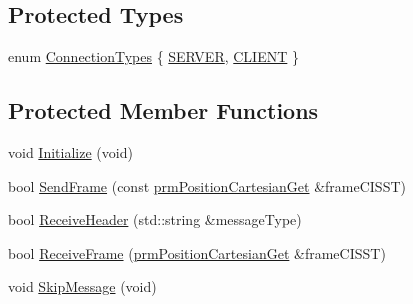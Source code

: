 \subsection*{Protected Types}
\begin{DoxyCompactItemize}
\item 
enum \hyperlink{classmts_open_i_g_t_link_aa7353a6a3f98f611defbaf89f13c8a27}{Connection\+Types} \{ \hyperlink{classmts_open_i_g_t_link_aa7353a6a3f98f611defbaf89f13c8a27a9cbc41def3c5107a96ae88dc2b81be4c}{S\+E\+R\+V\+E\+R}, 
\hyperlink{classmts_open_i_g_t_link_aa7353a6a3f98f611defbaf89f13c8a27a25025b3db414b3c15bc4c6664b876065}{C\+L\+I\+E\+N\+T}
 \}
\end{DoxyCompactItemize}
\subsection*{Protected Member Functions}
\begin{DoxyCompactItemize}
\item 
void \hyperlink{classmts_open_i_g_t_link_a77e185ccfb62504a0715138865d15b85}{Initialize} (void)
\item 
bool \hyperlink{classmts_open_i_g_t_link_a179b3a9dbe4601891943a646a2692329}{Send\+Frame} (const \hyperlink{classprm_position_cartesian_get}{prm\+Position\+Cartesian\+Get} \&frame\+C\+I\+S\+S\+T)
\item 
bool \hyperlink{classmts_open_i_g_t_link_aed77b6cd845636b25631465c28540ed2}{Receive\+Header} (std\+::string \&message\+Type)
\item 
bool \hyperlink{classmts_open_i_g_t_link_a9299853f065591da9999bc027f12c70a}{Receive\+Frame} (\hyperlink{classprm_position_cartesian_get}{prm\+Position\+Cartesian\+Get} \&frame\+C\+I\+S\+S\+T)
\item 
void \hyperlink{classmts_open_i_g_t_link_abaa5ab92e7ce6b8af3a777ca0e36605e}{Skip\+Message} (void)
\end{DoxyCompactItemize}
